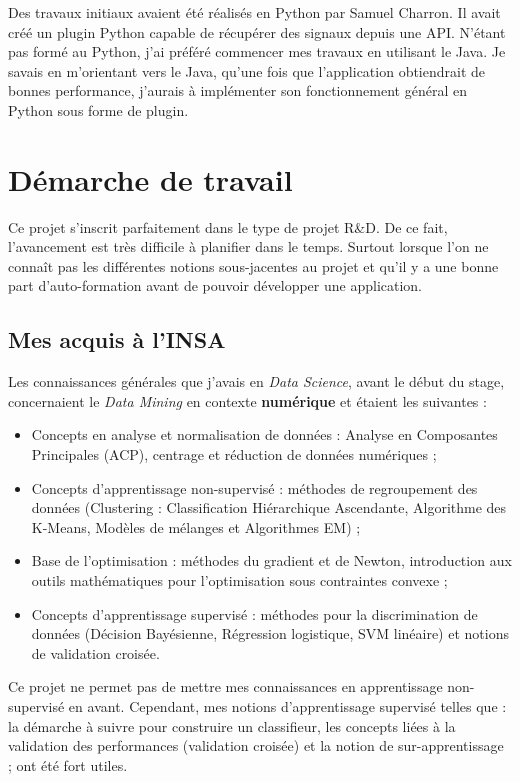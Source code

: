 Des travaux initiaux avaient été réalisés en Python par Samuel Charron. Il avait créé un plugin Python capable de récupérer des signaux depuis une API. N'étant pas formé au Python, j'ai préféré commencer mes travaux en utilisant le Java. Je savais en m'orientant vers le Java, qu'une fois que l'application obtiendrait de bonnes performance, j'aurais à implémenter son fonctionnement général en Python sous forme de plugin.

\section{Démarche de travail}
    Ce projet s'inscrit parfaitement dans le type de projet R\&D. De ce fait, l'avancement est très difficile à planifier dans le temps. Surtout lorsque l'on ne connaît pas les différentes notions sous-jacentes au projet et qu'il y a une bonne part d'auto-formation avant de pouvoir développer une application.

    \subsection{Mes acquis à l'INSA}
        Les connaissances générales que j'avais en \textit{Data Science}, avant le début du stage, concernaient le \textit{Data Mining} en contexte \textbf{numérique} et étaient les suivantes :
        \begin{itemize}
            \item Concepts en analyse et normalisation de données : Analyse en Composantes Principales (ACP), centrage et réduction de données numériques ;
            \item Concepts d'apprentissage non-supervisé : méthodes de regroupement des données (Clustering : Classification Hiérarchique Ascendante, Algorithme des K-Means, Modèles de mélanges et Algorithmes EM) ;
            \item Base de l'optimisation : méthodes du gradient et de Newton, introduction aux outils mathématiques pour l'optimisation sous contraintes convexe ;
            \item Concepts d'apprentissage supervisé : méthodes pour la discrimination de données (Décision Bayésienne, Régression logistique, SVM linéaire) et notions de validation croisée.\\
        \end{itemize}

\color{red}

        Ce projet ne permet pas de mettre mes connaissances en apprentissage non-supervisé en avant. Cependant, mes notions d'apprentissage supervisé telles que : la démarche à suivre pour construire un classifieur, les concepts liées à la validation des performances (validation croisée) et la notion de sur-apprentissage ; ont été fort utiles.\\

